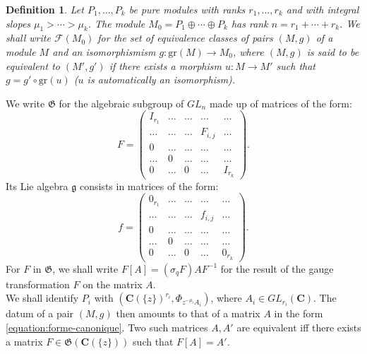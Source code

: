 \documentclass[english]{smfart}
\newtheorem{defn}[thm]{Definition}
\numberwithin{equation}{thm}
\def\sq{\sigma_q}
\def\C{{\mathbf C}}
\def\F{{\mathcal{F}}}
\def\gr{{\text{gr}}}
\def\G{{\mathfrak{G}}}
\def\g{{\mathfrak{g}}}
\def\Ka{{\C(\{z\})}}
\def\l{\left}
\def\r{\right}
\begin{document}
\begin{defn}
Let $P_{1},\ldots,P_{k}$ be pure modules with ranks $r_{1},\ldots,r_{k}$ 
and with integral slopes $\mu_{1} > \cdots > \mu_{k}$. The module
$M_{0} = P_{1} \oplus \cdots \oplus P_{k}$ has rank
$n = r_{1} + \cdots + r_{k}$. We shall write $\F(M_{0})$ for the set
of equivalence classes of pairs $(M,g)$ of a module $M$ and an
isomorphismism $g : \gr(M) \rightarrow M_{0}$, where $(M,g)$ is said to be 
equivalent to $(M',g')$ if there exists a morphism $u : M \rightarrow M'$ 
such that $g = g' \circ \gr(u)$ ($u$ is automatically an isomorphism).
\end{defn}

We write $\G$ for the algebraic subgroup of $GL_{n}$ made up of matrices 
of the form:
\begin{equation} \label{equation:automorphisme}
F = 
\begin{pmatrix}
I_{r_{1}} & \ldots & \ldots & \ldots & \ldots \\
\ldots & \ldots & \ldots  & F_{i,j} & \ldots \\
0      & \ldots & \ldots   & \ldots & \ldots \\
\ldots & 0 & \ldots  & \ldots & \ldots \\
0      & \ldots & 0       & \ldots & I_{r_{k}}     
\end{pmatrix}.
\end{equation}
Its Lie algebra $\g$ consists in matrices of the form:
\begin{equation} \label{equation:endomorphisme}
f = 
\begin{pmatrix}
0_{r_{1}} & \ldots & \ldots & \ldots & \ldots \\
\ldots & \ldots & \ldots  & f_{i,j} & \ldots \\
0      & \ldots & \ldots   & \ldots & \ldots \\
\ldots & 0 & \ldots  & \ldots & \ldots \\
0      & \ldots & 0       & \ldots & 0_{r_{k}}     
\end{pmatrix}.
\end{equation}
For $F$ in $\G$, we shall write $F[A] = \l(\sq F\r) A F^{-1}$ for
the result of the gauge transformation $F$ on the matrix $A$. \\

We shall identify $P_{i}$ with $(\Ka^{r_{i}},\Phi_{z^{-\mu_{i}} A_{i}})$, 
where $A_{i} \in GL_{r_{i}}(\C)$. The datum of a pair $(M,g)$ then
amounts to that of a matrix $A$ in the form \ref{equation:forme-canonique}.
Two such matrices $A,A'$ are equivalent iff there exists a matrix
$F \in \G(\Ka)$ such that $F[A] = A'$. \\
\end{document}

